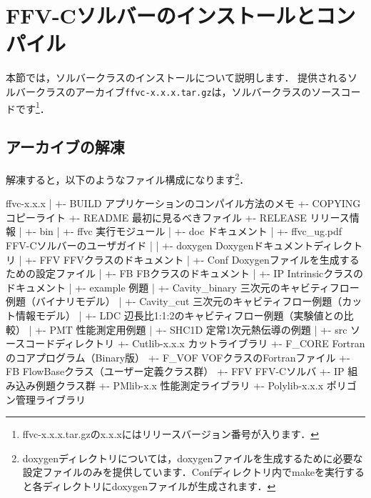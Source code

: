 \hypertarget{tgt:installFFV-C}{\section{FFV-Cソルバーのインストールとコンパイル}}

本節では，ソルバークラスのインストールについて説明します．
提供されるソルバークラスのアーカイブ\verb|ffvc-x.x.x.tar.gz|は，ソルバークラスのソースコードです\footnote{ffvc-x.x.x.tar.gzのx.x.xにはリリースバージョン番号が入ります．}．

\subsection{アーカイブの解凍}
{\small
{}
}

解凍すると，以下のようなファイル構成になります\footnote{doxygenディレクトリについては，doxygenファイルを生成するために必要な設定ファイルのみを提供しています．Confディレクトリ内でmakeを実行すると各ディレクトリにdoxygenファイルが生成されます．}．

{ \small
\begin{program}
ffvc-x.x.x
  |
  +- BUILD                        アプリケーションのコンパイル方法のメモ
  +- COPYING                      コピーライト
  +- README                       最初に見るべきファイル
  +- RELEASE                      リリース情報
  |
  +- bin                          
  |   +- ffvc                     実行モジュール
  |
  +- doc                          ドキュメント
  |   +- ffvc_ug.pdf              FFV-Cソルバーのユーザガイド
  |   
  |
  +- doxygen                      Doxygenドキュメントディレクトリ
  |   +- FFV                      FFVクラスのドキュメント
  |   +- Conf                     Doxygenファイルを生成するための設定ファイル
  |   +- FB                       FBクラスのドキュメント
  |   +- IP                       Intrinsicクラスのドキュメント
  |
  +- example                      例題
  |   +- Cavity_binary            三次元のキャビティフロー例題（バイナリモデル）
  |   +- Cavity_cut               三次元のキャビティフロー例題（カット情報モデル）
  |   +- LDC                      辺長比1:1:2のキャビティフロー例題（実験値との比較）
  |   +- PMT                      性能測定用例題
  |   +- SHC1D                    定常1次元熱伝導の例題
  |
  +- src                          ソースコードディレクトリ
      +- Cutlib-x.x.x             カットライブラリ
      +- F_CORE                   Fortranのコアプログラム（Binary版）
      +- F_VOF                    VOFクラスのFortranファイル
      +- FB                       FlowBaseクラス（ユーザー定義クラス群）
      +- FFV                      FFV-Cソルバ
      +- IP                       組み込み例題クラス群
      +- PMlib-x.x                性能測定ライブラリ
      +- Polylib-x.x.x            ポリゴン管理ライブラリ

\end{program}
}

